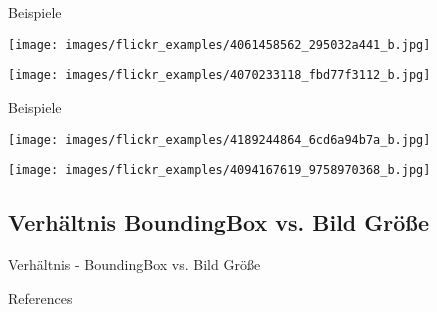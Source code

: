 \documentclass[18pt]{beamer}
\begin{document}
\begin{frame}{Beispiele}
\begin{minipage}[c]{0.4\textwidth}
	\texttt{[image: images/flickr\_examples/4061458562\_295032a441\_b.jpg]}
\end{minipage}
\begin{minipage}[c]{0.14\textwidth}
	\hfill
\end{minipage}	
\begin{minipage}[c]{0.4\textwidth}
	\texttt{[image: images/flickr\_examples/4070233118\_fbd77f3112\_b.jpg]}
\end{minipage}
\end{frame}

\begin{frame}{Beispiele}
\begin{minipage}[c]{0.4\textwidth}
	\texttt{[image: images/flickr\_examples/4189244864\_6cd6a94b7a\_b.jpg]}
\end{minipage}
\begin{minipage}[c]{0.18\textwidth}
	\hfill
\end{minipage}
\begin{minipage}[c]{0.4\textwidth}
	\texttt{[image: images/flickr\_examples/4094167619\_9758970368\_b.jpg]}
\end{minipage}
\end{frame}

\subsection{Verhältnis BoundingBox vs. Bild Größe}
\begin{frame}{Verhältnis - BoundingBox vs. Bild Größe}
\begin{figure}
\end{figure}
\end{frame}

\appendix
\beginbackup

\begin{frame}[allowframebreaks]{References}
\printbibliography
\end{frame}

\backupend
\end{document}
